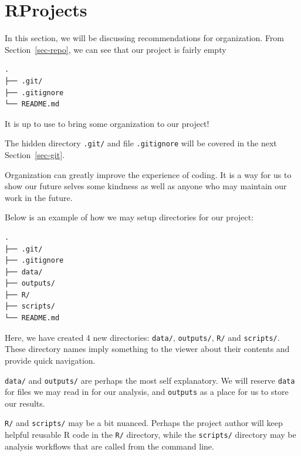 \documentclass[
  letterpaper,
  DIV=11,
  numbers=noendperiod]{scrreprt}
\begin{document}
\section{RProjects}\label{rprojects}

In this section, we will be discussing recommendations for organization.
From Section~\ref{sec-repo}, we can see that our project is fairly empty

\begin{verbatim}
.
├── .git/
├── .gitignore
└── README.md
\end{verbatim}

It is up to use to bring some organization to our project!

\begin{tcolorbox}[enhanced jigsaw, bottomtitle=1mm, bottomrule=.15mm, toprule=.15mm, opacityback=0, leftrule=.75mm, breakable, colback=white, toptitle=1mm, left=2mm, coltitle=black, titlerule=0mm, opacitybacktitle=0.6, title=\textcolor{quarto-callout-note-color}{\faInfo}\hspace{0.5em}{Note}, rightrule=.15mm, arc=.35mm, colframe=quarto-callout-note-color-frame, colbacktitle=quarto-callout-note-color!10!white]

The hidden directory \texttt{.git/} and file \texttt{.gitignore} will be
covered in the next Section~\ref{sec-git}.

\end{tcolorbox}

Organization can greatly improve the experience of coding. It is a way
for us to show our future selves some kindness as well as anyone who may
maintain our work in the future.

Below is an example of how we may setup directories for our project:

\begin{verbatim}
.
├── .git/
├── .gitignore
├── data/
├── outputs/
├── R/
├── scripts/
└── README.md
\end{verbatim}

Here, we have created 4 new directories: \texttt{data/},
\texttt{outputs/}, \texttt{R/} and \texttt{scripts/}. These directory
names imply something to the viewer about their contents and provide
quick navigation.

\texttt{data/} and \texttt{outputs/} are perhaps the most self
explanatory. We will reserve \texttt{data} for files we may read in for
our analysis, and \texttt{outputs} as a place for us to store our
results.

\texttt{R/} and \texttt{scripts/} may be a bit nuanced. Perhaps the
project author will keep helpful reusable R code in the \texttt{R/}
directory, while the \texttt{scripts/} directory may be analysis
workflows that are called from the command line.
\end{document}
